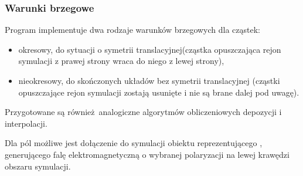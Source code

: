 





\subsubsection{Warunki brzegowe}
Program implementuje dwa rodzaje warunków brzegowych dla cząstek:
\begin{itemize}
\item okresowy, do sytuacji o symetrii translacyjnej(cząstka opuszczająca rejon symulacji z prawej strony wraca do niego z lewej strony),
\item nieokresowy, do skończonych układów bez symetrii translacyjnej (cząstki opuszczające rejon symulacji zostają usunięte i nie są brane
dalej pod uwagę).
\end{itemize}

Przygotowane są również analogiczne  
algorytmów obliczeniowych depozycji i interpolacji.

Dla pól możliwe jest dołączenie do symulacji obiektu reprezentującego ,
generującego falę elektromagnetyczną o wybranej polaryzacji na lewej krawędzi obszaru symulacji.

